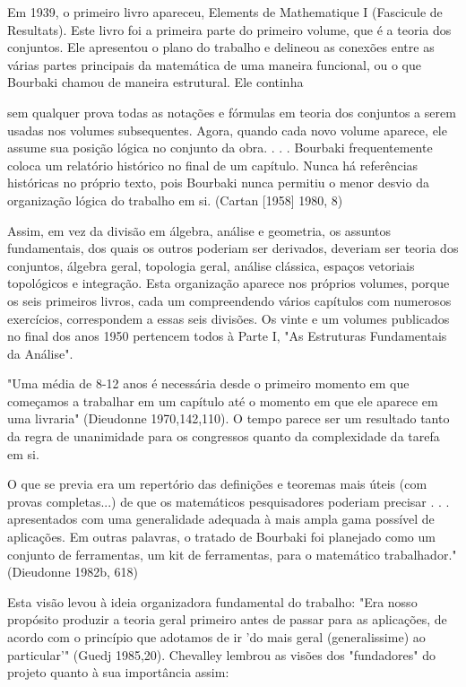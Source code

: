 \documentclass[a4paper,12pt]{article}[abntex2]
\begin{document}
Em 1939, o primeiro livro apareceu, Elements de Mathematique I (Fascicule de Resultats). Este livro foi a primeira parte do primeiro volume, que é a teoria dos conjuntos. Ele apresentou o plano do trabalho e delineou as conexões entre as várias partes principais da matemática de uma maneira funcional, ou o que Bourbaki chamou de maneira estrutural. Ele continha

sem qualquer prova todas as notações e fórmulas em teoria dos conjuntos a serem usadas nos volumes subsequentes. Agora, quando cada novo volume aparece, ele assume sua posição lógica no conjunto da obra. . . . Bourbaki frequentemente coloca um relatório histórico no final de um capítulo. Nunca há referências históricas no próprio texto, pois Bourbaki nunca permitiu o menor desvio da organização lógica do trabalho em si. (Cartan [1958] 1980, 8)

Assim, em vez da divisão em álgebra, análise e geometria, os assuntos fundamentais, dos quais os outros poderiam ser derivados, deveriam ser teoria dos conjuntos, álgebra geral, topologia geral, análise clássica, espaços vetoriais topológicos e integração. Esta organização aparece nos próprios volumes, porque os seis primeiros livros, cada um compreendendo vários capítulos com numerosos exercícios, correspondem a essas seis divisões. Os vinte e um volumes publicados no final dos anos 1950 pertencem todos à Parte I, "As Estruturas Fundamentais da Análise".

"Uma média de 8-12 anos é necessária desde o primeiro momento em que começamos a trabalhar em um capítulo até o momento em que ele aparece em uma livraria" (Dieudonne 1970,142,110). O tempo parece ser um resultado tanto da regra de unanimidade para os congressos quanto da complexidade da tarefa em si.

O que se previa era um repertório das definições e teoremas mais úteis (com provas completas...) de que os matemáticos pesquisadores poderiam precisar . . . apresentados com uma generalidade adequada à mais ampla gama possível de aplicações. Em outras palavras, o tratado de Bourbaki foi planejado como um conjunto de ferramentas, um kit de ferramentas, para o matemático trabalhador."(Dieudonne 1982b, 618)

Esta visão levou à ideia organizadora fundamental do trabalho: "Era nosso propósito produzir a teoria geral primeiro antes de passar para as aplicações, de acordo com o princípio que adotamos de ir 'do mais geral (generalissime) ao particular'" (Guedj 1985,20). Chevalley lembrou as visões dos "fundadores" do projeto quanto à sua importância assim:
\end{document}
